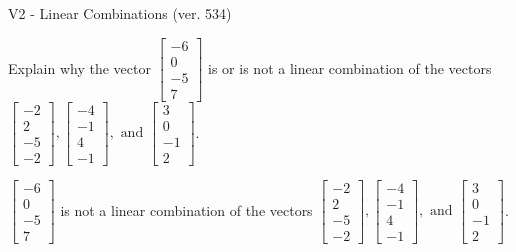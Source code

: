\begin{exercise}
  \begin{exerciseTitle}V2 - Linear Combinations (ver. 534)\end{exerciseTitle}
  \begin{exerciseStatement}
    Explain why the vector \(\left[\begin{array}{c}
-6 \\
0 \\
-5 \\
7
\end{array}\right]\)  is or is not a linear 
	combination of the vectors \(\left[\begin{array}{c}
-2 \\
2 \\
-5 \\
-2
\end{array}\right] , \left[\begin{array}{c}
-4 \\
-1 \\
4 \\
-1
\end{array}\right] , \text{ and } \left[\begin{array}{c}
3 \\
0 \\
-1 \\
2
\end{array}\right]\).
	


  \end{exerciseStatement}
  \begin{exerciseAnswer}
   \(\left[\begin{array}{c}
-6 \\
0 \\
-5 \\
7
\end{array}\right]\) 
  	 is not  
	a linear combination of the vectors \(\left[\begin{array}{c}
-2 \\
2 \\
-5 \\
-2
\end{array}\right] , \left[\begin{array}{c}
-4 \\
-1 \\
4 \\
-1
\end{array}\right] , \text{ and } \left[\begin{array}{c}
3 \\
0 \\
-1 \\
2
\end{array}\right]\).

	
  


  \end{exerciseAnswer}
\end{exercise}